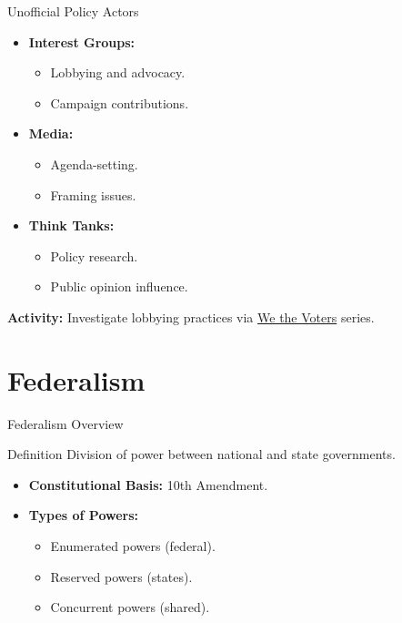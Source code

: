 \documentclass[12pt]{beamer}
\begin{document}
\begin{frame}{Unofficial Policy Actors}
    \begin{itemize}
        \item \textbf{Interest Groups:}
        \begin{itemize}
            \item Lobbying and advocacy.
            \item Campaign contributions.
        \end{itemize}
        \item \textbf{Media:}
        \begin{itemize}
            \item Agenda-setting.
            \item Framing issues.
        \end{itemize}
        \item \textbf{Think Tanks:}
        \begin{itemize}
            \item Policy research.
            \item Public opinion influence.
        \end{itemize}
    \end{itemize}
    \textbf{Activity:} Investigate lobbying practices via \href{https://wethevoters.org}{We the Voters} series.
\end{frame}

\section{Federalism}
\begin{frame}{Federalism Overview}
    \begin{block}{Definition}
        Division of power between national and state governments.
    \end{block}
    \begin{itemize}
        \item \textbf{Constitutional Basis:} 10th Amendment.
        \item \textbf{Types of Powers:}
        \begin{itemize}
            \item Enumerated powers (federal).
            \item Reserved powers (states).
            \item Concurrent powers (shared).
        \end{itemize}
    \end{itemize}
\end{frame}
\end{document}
